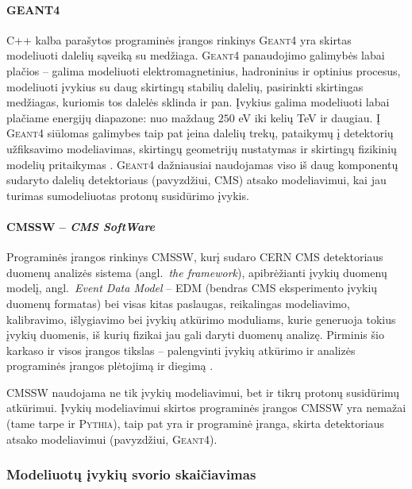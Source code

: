 \documentclass[a4paper, 12pt]{article}
\begin{document}
\paragraph{GEANT4\\}
C++ kalba parašytos programinės įrangos rinkinys \textsc{Geant4} yra skirtas modeliuoti dalelių sąveiką su medžiaga. \textsc{Geant4} panaudojimo galimybės labai plačios -- galima modeliuoti elektromagnetinius, hadroninius ir optinius procesus, modeliuoti įvykius su daug skirtingų stabilių dalelių, pasirinkti skirtingas medžiagas, kuriomis tos dalelės sklinda ir pan. Įvykius galima modeliuoti labai plačiame energijų diapazone: nuo maždaug $250$ eV iki kelių TeV ir daugiau. Į \textsc{Geant4} siūlomas galimybes taip pat įeina dalelių trekų, pataikymų į detektorių užfiksavimo modeliavimas, skirtingų geometrijų nustatymas ir skirtingų fizikinių modelių pritaikymas \cite{geant4}. \textsc{Geant4} dažniausiai naudojamas viso iš daug komponentų sudaryto dalelių detektoriaus (pavyzdžiui, CMS) atsako modeliavimui, kai jau turimas sumodeliuotas protonų susidūrimo įvykis.

\paragraph{CMSSW -- \textit{CMS SoftWare}\\}
Programinės įrangos rinkinys CMSSW, kurį sudaro CERN CMS detektoriaus duomenų analizės sistema (angl.\ \textit{the framework}), apibrėžianti įvykių duomenų modelį, angl.\ \textit{Event Data Model} -- EDM (bendras CMS eksperimento įvykių duomenų formatas) bei visas kitas paslaugas, reikalingas modeliavimo, kalibravimo, išlygiavimo bei įvykių atkūrimo moduliams, kurie generuoja tokius įvykių duomenis, iš kurių fizikai jau gali daryti duomenų analizę. Pirminis šio karkaso ir visos įrangos tikslas -- palengvinti įvykių atkūrimo ir analizės programinės įrangos plėtojimą ir diegimą \cite{cmsswtwiki}.

CMSSW naudojama ne tik įvykių modeliavimui, bet ir tikrų protonų susidūrimų atkūrimui. Įvykių modeliavimui skirtos programinės įrangos CMSSW yra nemažai (tame tarpe ir \textsc{Pythia}), taip pat yra ir programinė įranga, skirta detektoriaus atsako modeliavimui (pavyzdžiui, \textsc{Geant4})\cite{cmsswev}. 

\subsubsection{Modeliuotų įvykių svorio skaičiavimas}\label{sec:MCweight}
\end{document}
